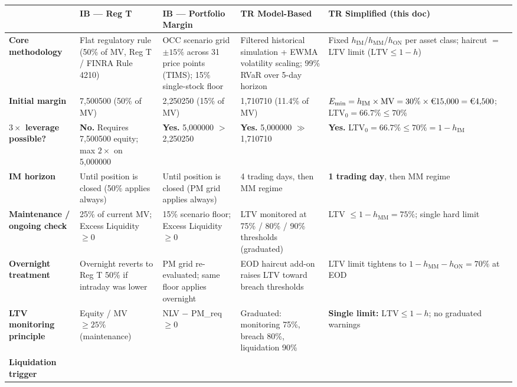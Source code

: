 \documentclass[9pt, a4paper]{extarticle}
\newcommand{\EUR}[1]{\ifmmode\text{\texteuro}#1\else\texteuro#1\fi}
\begin{document}
\begin{landscape}
\renewcommand{\arraystretch}{1.45}
\small
\begin{tabularx}{\linewidth}{>{\bfseries}p{4.2cm} p{3.8cm} p{3.8cm} p{3.8cm} p{4.2cm}}
\toprule
  & \textbf{IB — Reg T}
  & \textbf{IB — Portfolio Margin}
  & \textbf{TR Model-Based}
  & \textbf{TR Simplified (this doc)} \\
\midrule
Core methodology
  & Flat regulatory rule (50\% of MV, Reg T / FINRA Rule 4210)
  & OCC scenario grid $\pm 15\%$ across 31 price points (TIMS); 15\% single-stock floor
  & Filtered historical simulation + EWMA volatility scaling; 99\% RVaR over 5-day horizon
  & Fixed $h_{\mathrm{IM}}$/$h_{\mathrm{MM}}$/$h_{\mathrm{ON}}$ per asset class; haircut $=$ LTV limit ($\mathrm{LTV} \leq 1-h$) \\
\rowcolor{gray!8}
Initial margin
  & \EUR{7{,}500} (50\% of MV)
  & \EUR{2{,}250} (15\% of MV)
  & \EUR{1{,}710} (11.4\% of MV)
  & $E_{\min} = h_{\mathrm{IM}} \times \mathrm{MV} = 30\% \times \EUR{15{,}000} = \EUR{4{,}500}$; LTV$_0 = 66.7\% \leq 70\%$ \\
$3{\times}$ leverage possible?
  & \textbf{No.} Requires \EUR{7{,}500} equity; max $2{\times}$ on \EUR{5{,}000}
  & \textbf{Yes.} \EUR{5{,}000} $>$ \EUR{2{,}250}
  & \textbf{Yes.} \EUR{5{,}000} $\gg$ \EUR{1{,}710}
  & \textbf{Yes.} LTV$_0 = 66.7\% \leq 70\% = 1 - h_{\mathrm{IM}}$ \\
\rowcolor{gray!8}
IM horizon
  & Until position is closed (50\% applies always)
  & Until position is closed (PM grid applies always)
  & 4 trading days, then MM regime
  & \textbf{1 trading day}, then MM regime \\
Maintenance / ongoing check
  & 25\% of current MV; Excess Liquidity $\geq 0$
  & 15\% scenario floor; Excess Liquidity $\geq 0$
  & LTV monitored at 75\% / 80\% / 90\% thresholds (graduated)
  & LTV $\leq 1 - h_{\mathrm{MM}} = 75\%$; single hard limit \\
\rowcolor{gray!8}
Overnight treatment
  & Overnight reverts to Reg T 50\% if intraday was lower
  & PM grid re-evaluated; same floor applies overnight
  & EOD haircut add-on raises LTV toward breach thresholds
  & LTV limit tightens to $1 - h_{\mathrm{MM}} - h_{\mathrm{ON}} = 70\%$ at EOD \\
LTV monitoring principle
  & Equity / MV $\geq 25\%$ (maintenance)
  & NLV $-$ PM\_req $\geq 0$
  & Graduated: monitoring 75\%, breach 80\%, liquidation 90\%
  & \textbf{Single limit:} $\mathrm{LTV} \leq 1 - h$; no graduated warnings \\
\rowcolor{gray!8}
Liquidation trigger

\end{tabularx}
\end{landscape}
\end{document}
